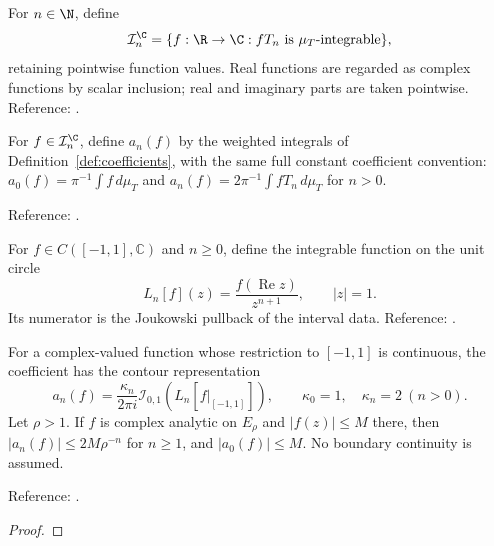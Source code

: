 \begin{definition}
\label{def:complex-coefficient-input}
\leanok
For $n\in\N$, define
\[
\mathcal I_n^{\C}=\{f:\R\to\C: fT_n\text{ is }\mu_T\text{-integrable}\},
\]
retaining pointwise function values. Real functions are regarded as complex
functions by scalar inclusion; real and imaginary parts are taken pointwise.
Reference: \cite[Chapter 3]{atap}.
\end{definition}

\begin{definition}
\label{def:complex-coefficients}
\leanok
For $f\in\mathcal I_n^{\C}$, define $a_n(f)$ by the weighted integrals of
Definition~\ref{def:coefficients}, with the same full constant coefficient
convention: $a_0(f)=\pi^{-1}\int f\,d\mu_T$ and $a_n(f)=2\pi^{-1}\int fT_n\,d\mu_T$
for $n>0$.

Reference: \cite[Chapters 3 and 8]{atap}.
\end{definition}

\begin{definition}
\label{def:joukowski-laurent-input}
\leanok
For $f\in C([-1,1],\mathbb C)$ and $n\ge0$, define the integrable function on the unit circle
\[
L_n[f](z)=\frac{f(\operatorname{Re}z)}{z^{n+1}},\qquad |z|=1.
\]
Its numerator is the Joukowski pullback of the interval data.
Reference: \cite[Theorems 3.1 and 8.1]{atap}.
\end{definition}

\begin{theorem}
\label{thm:coefficient-decay}
\leanok
For a complex-valued function whose restriction to $[-1,1]$ is continuous,
the coefficient has the contour representation
\[
a_n(f)=\frac{\kappa_n}{2\pi i}\mathcal I_{0,1}(L_n[f|_{[-1,1]}]),
\qquad \kappa_0=1,\quad \kappa_n=2\ (n>0).
\]
Let $\rho>1$. If $f$ is complex analytic on $E_\rho$ and $|f(z)|\le M$ there, then
$|a_n(f)|\le2M\rho^{-n}$ for $n\ge1$, and $|a_0(f)|\le M$.
No boundary continuity is assumed.

Reference: \cite[Theorem 8.1]{atap}.
\end{theorem}
\begin{proof}
\leanok
\end{proof}

